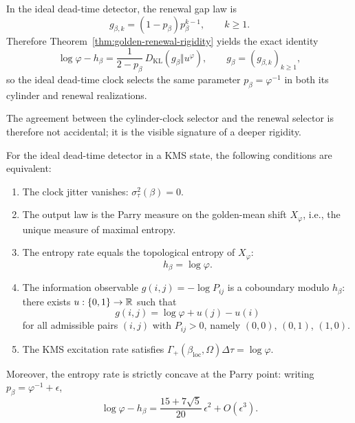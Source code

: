 In the ideal dead-time detector, the renewal gap law is
\[
g_{\beta,k}
=
(1-p_\beta)p_\beta^{k-1},
\qquad k\ge 1.
\]
Therefore Theorem~\ref{thm:golden-renewal-rigidity} yields the exact identity
\begin{equation}\label{eq:ideal-renewal-parry-gap}
\log\varphi-h_\beta
=
\frac{1}{2-p_\beta}\,
D_{\mathrm{KL}}(g_\beta\Vert u^\varphi),
\qquad
g_\beta=(g_{\beta,k})_{k\ge 1},
\end{equation}
so the ideal dead-time clock selects the same parameter $p_\beta=\varphi^{-1}$ in both its cylinder and renewal realizations.

The agreement between the cylinder-clock selector and the renewal selector is therefore not accidental; it is the visible signature of a deeper rigidity.

\begin{theorem}\label{thm:parry-kms}
For the ideal dead-time detector in a KMS state, the following conditions are equivalent:
\begin{enumerate}[label=(\roman*),leftmargin=*,itemsep=2pt]
\item The clock jitter vanishes: $\sigma_\tau^2(\beta)=0$.
\item The output law is the Parry measure \cite{Parry1964} on the golden-mean shift $X_\varphi$, i.e., the unique measure of maximal entropy.
\item The entropy rate equals the topological entropy of $X_\varphi$:
\begin{equation}\label{eq:parry-entropy}
h_\beta=\log\varphi.
\end{equation}
\item The information observable $g(i,j)=-\log P_{ij}$ is a coboundary modulo $h_\beta$: there exists $u:\{0,1\}\to\mathbb{R}$ such that
\begin{equation}\label{eq:coboundary}
g(i,j)=\log\varphi+u(j)-u(i)
\end{equation}
for all admissible pairs $(i,j)$ with $P_{ij}>0$, namely $(0,0)$, $(0,1)$, $(1,0)$.
\item The KMS excitation rate satisfies $\Gamma_+(\beta_{\mathrm{loc}},\Omega)\Delta\tau=\log\varphi$.
\end{enumerate}
Moreover, the entropy rate is strictly concave at the Parry point: writing $p_\beta=\varphi^{-1}+\epsilon$,
\begin{equation}\label{eq:entropy-deficit}
\log\varphi-h_\beta
=
\frac{15+7\sqrt 5}{20}\,\epsilon^2
+
O(\epsilon^3).
\end{equation}
\end{theorem}

